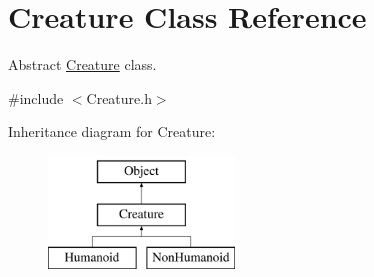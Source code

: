 \hypertarget{classCreature}{\section{Creature Class Reference}
\label{classCreature}
}


Abstract \hyperlink{classCreature}{Creature} class.  




{\ttfamily \#include $<$Creature.\-h$>$}

Inheritance diagram for Creature\-:\begin{figure}[H]
\begin{center}
\leavevmode
\includegraphics[height=3.000000cm]{classCreature}
\end{center}
\end{figure}

